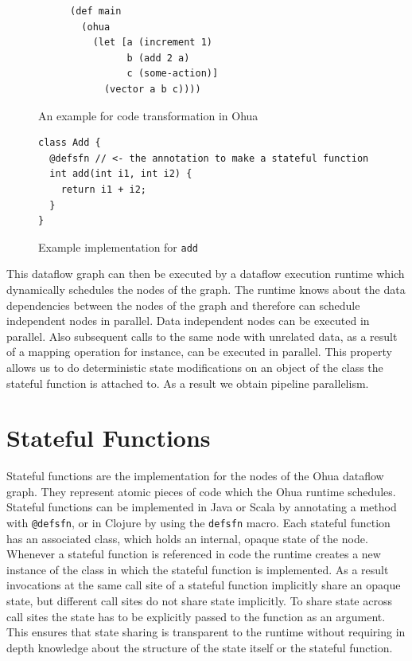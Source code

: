 \begin{figure}[h]
  \begin{subfigure}{.5\textwidth}
\begin{verbatim}
(def main
  (ohua
    (let [a (increment 1)
          b (add 2 a)
          c (some-action)]
      (vector a b c))))
\end{verbatim}
  \end{subfigure}
  \begin{subfigure}{.5\textwidth}
  \end{subfigure}

\caption{An example for code transformation in Ohua}
\label{fig:ohua-code-example}
\end{figure}

\begin{figure}[h]
\begin{verbatim}
class Add {
  @defsfn // <- the annotation to make a stateful function
  int add(int i1, int i2) {
    return i1 + i2;
  }
}
\end{verbatim}
\caption{Example implementation for \texttt{add}}
\label{fig:ohua-sfn-example}
\end{figure}

This dataflow graph can then be executed by a dataflow execution runtime which dynamically schedules the nodes of the graph.
The runtime knows about the data dependencies between the nodes of the graph and therefore can schedule independent nodes in parallel.
Data independent nodes can be executed in parallel.
Also subsequent calls to the same node with unrelated data, as a result of a mapping operation for instance, can be executed in parallel.
This property allows us to do deterministic state modifications on an object of the class the stateful function is attached to.
As a result we obtain pipeline parallelism.

\section{Stateful Functions}

\label{sec:stateful-functions}

Stateful functions are the implementation for the nodes of the Ohua dataflow graph.
They represent atomic pieces of code which the Ohua runtime schedules.
Stateful functions can be implemented in Java or Scala\cite{ScalaLanguage} by annotating a method with \texttt{@defsfn}, or in Clojure by using the \texttt{defsfn} macro.
Each stateful function has an associated class, which holds an internal, opaque state of the node.
Whenever a stateful function is referenced in code the runtime creates a new instance of the class in which the stateful function is implemented.
As a result invocations at the same call site of a stateful function implicitly share an opaque state, but different call sites do not share state implicitly.
To share state across call sites the state has to be explicitly passed to the function as an argument.
This ensures that state sharing is transparent to the runtime without requiring in depth knowledge about the structure of the state itself or the stateful function.

